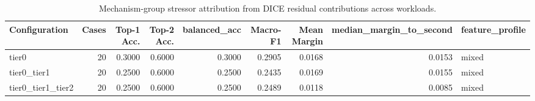 \begin{table}[t]
\centering
\caption{Mechanism-group stressor attribution from DICE residual contributions across workloads.}
\label{tab:dice_stressor_diagnosis}
\footnotesize
\begin{tabular}{lrrrrrrrl}
\toprule
Configuration & Cases & Top-1 Acc. & Top-2 Acc. & balanced_acc & Macro-F1 & Mean Margin & median_margin_to_second & feature_profile \\
\midrule
tier0 & 20 & 0.3000 & 0.6000 & 0.3000 & 0.2905 & 0.0168 & 0.0153 & mixed \\
tier0_tier1 & 20 & 0.2500 & 0.6000 & 0.2500 & 0.2435 & 0.0169 & 0.0155 & mixed \\
tier0_tier1_tier2 & 20 & 0.2500 & 0.6000 & 0.2500 & 0.2489 & 0.0118 & 0.0085 & mixed \\
\bottomrule
\end{tabular}

\end{table}
